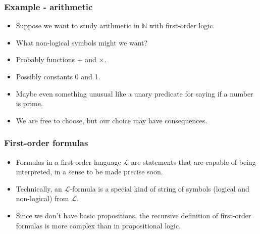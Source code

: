 \documentclass[handout]{beamer}
\newcommand{\sL}{\mathscr{L}}
\newcommand{\bN}{\mathbb{N}}
\begin{document}
\begin{frame}
\frametitle{Example - arithmetic}
\begin{itemize}
\item Suppose we want to study arithmetic in $\bN$ with first-order logic.
\vspace{0.5cm}
\item What non-logical symbols might we want?
\vspace{0.5cm}
\item Probably functions $+$ and $\times$.
\vspace{0.5cm}
\item Possibly constants 0 and 1.
\vspace{0.5cm}
\item Maybe even something unusual like a unary predicate for saying if a number is prime.
\vspace{0.5cm}
\item We are free to choose, but our choice may have consequences.
\end{itemize}
\end{frame}

\begin{frame}
\frametitle{First-order formulas}
\begin{itemize}
\item Formulas in a first-order language $\sL$ are statements that are capable of being interpreted, in a sense to be made precise soon.
\vspace{0.5cm}
\item Technically, an $\sL$-formula is a special kind of string of symbols (logical and non-logical) from $\sL$. 
\vspace{0.5cm}
\item Since we don't have basic propositions, the recursive definition of first-order formulas is more complex than in propositional logic. 
\end{itemize}
\end{frame}
\end{document}
